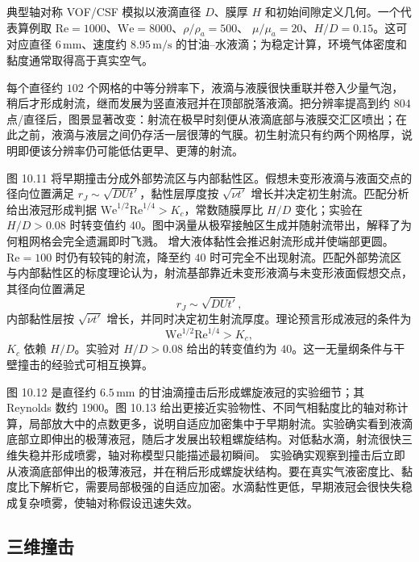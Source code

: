 \documentclass[11pt,a4paper,openany,fontset=none]{ctexbook}
\begin{document}
典型轴对称 VOF/CSF 模拟以液滴直径 $D$、膜厚 $H$ 和初始间隙定义几何。一个代表算例取
$\mathrm{Re}=1000$、$\mathrm{We}=8000$、$\rho/\rho_a=500$、
$\mu/\mu_a=20$、$H/D=0.15$。这可对应直径 $6\,\mathrm{mm}$、速度约
$8.95\,\mathrm{m/s}$ 的甘油--水液滴；为稳定计算，环境气体密度和黏度通常取得高于真实空气。

每个直径约 $102$ 个网格的中等分辨率下，液滴与液膜很快重联并卷入少量气泡，稍后才形成射流，继而发展为竖直液冠并在顶部脱落液滴。把分辨率提高到约 $804$ 点/直径后，图景显著改变：射流在极早时刻便从液滴底部与液膜交汇区喷出；在此之前，液滴与液层之间仍存活一层很薄的气膜。初生射流只有约两个网格厚，说明即便该分辨率仍可能低估更早、更薄的射流。

图 10.11 将早期撞击分成外部势流区与内部黏性区。假想未变形液滴与液面交点的径向位置满足 $r_J\sim\sqrt{DUt'}$，黏性层厚度按 $\sqrt{\nu t'}$ 增长并决定初生射流。匹配分析给出液冠形成判据 $\mathrm{We}^{1/2}\mathrm{Re}^{1/4}>K_c$，常数随膜厚比 $H/D$ 变化；实验在 $H/D>0.08$ 时转变值约 40。图中涡量从极窄接触区生成并随射流带出，解释了为何粗网格会完全遗漏即时飞溅。
增大液体黏性会推迟射流形成并使端部更圆。$\mathrm{Re}=100$ 时仍有较钝的射流，降至约 $40$ 时可完全不出现射流。匹配外部势流区与内部黏性区的标度理论认为，射流基部靠近未变形液滴与未变形液面假想交点，其径向位置满足
\begin{equation}
 r_J\sim\sqrt{DUt'},
\end{equation}
内部黏性层按 $\sqrt{\nu t'}$ 增长，并同时决定初生射流厚度。理论预言形成液冠的条件为
\begin{equation}
 \mathrm{We}^{1/2}\mathrm{Re}^{1/4}>K_c,
 \tag{10.3}
\end{equation}
$K_c$ 依赖 $H/D$。实验对 $H/D>0.08$ 给出的转变值约为 $40$。这一无量纲条件与干壁撞击的经验式可相互换算。

图 10.12 是直径约 $6.5\,\mathrm{mm}$ 的甘油滴撞击后形成螺旋液冠的实验细节；其 Reynolds 数约 1900。图 10.13 给出更接近实验物性、不同气相黏度比的轴对称计算，局部放大中的点数更多，说明自适应加密集中于早期射流。实验确实看到液滴底部立即伸出的极薄液冠，随后才发展出较粗螺旋结构。对低黏水滴，射流很快三维失稳并形成喷雾，轴对称模型只能描述最初瞬间。
实验确实观察到撞击后立即从液滴底部伸出的极薄液冠，并在稍后形成螺旋状结构。要在真实气液密度比、黏度比下解析它，需要局部极强的自适应加密。水滴黏性更低，早期液冠会很快失稳成复杂喷雾，使轴对称假设迅速失效。

\subsection{三维撞击}
\end{document}
